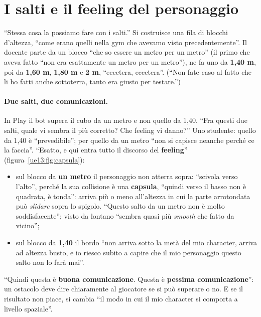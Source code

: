 \section{I salti e il feeling del personaggio}
\label{ue13:sec:salti}

``Stessa cosa la possiamo fare con i salti.'' Si costruisce una fila di blocchi d'altezza,
``come erano quelli nella gym che avevamo visto precedentemente''. Il docente parte da un
blocco ``che so essere un metro per un metro'' (il primo che aveva fatto ``non era
esattamente un metro per un metro''), ne fa uno da \textbf{1,40 m}, poi da \textbf{1,60 m},
\textbf{1,80 m} e \textbf{2 m}, ``eccetera, eccetera''. (``Non fate caso al fatto che li ho
fatti anche sottoterra, tanto era giusto per testare.'')

\paragraph{Due salti, due comunicazioni.} In Play il bot supera il cubo da un metro e non
quello da 1,40. ``Fra questi due salti, quale vi sembra il più corretto? Che feeling vi
danno?'' Uno studente: quello da 1,40 è ``prevedibile''; per quello da un metro ``non si
capisce neanche perché ce la faccia''. ``Esatto, e qui entra tutto il discorso del
\textbf{feeling}'' (figura~\ref{ue13:fig:capsula}):
\begin{itemize}
  \item sul blocco da \textbf{un metro} il personaggio non atterra sopra: ``scivola verso
        l'alto'', perché la sua collisione è una \textbf{capsula}, ``quindi verso il basso
        non è quadrata, è tonda'': arriva più o meno all'altezza in cui la parte
        arrotondata può \emph{slidare} sopra lo spigolo. ``Questo salto da un metro non è
        molto soddisfacente''; visto da lontano ``sembra quasi più \emph{smooth} che fatto da
        vicino'';
  \item sul blocco da \textbf{1,40} il bordo ``non arriva sotto la metà del mio character,
        arriva ad altezza busto, e io riesco subito a capire che il mio personaggio questo
        salto non lo farà mai''.
\end{itemize}
``Quindi questa è \textbf{buona comunicazione}. Questa è \textbf{pessima comunicazione}'':
un ostacolo deve dire chiaramente al giocatore se si può superare o no. E se il risultato
non piace, si cambia ``il modo in cui il mio character si comporta a livello spaziale''.

